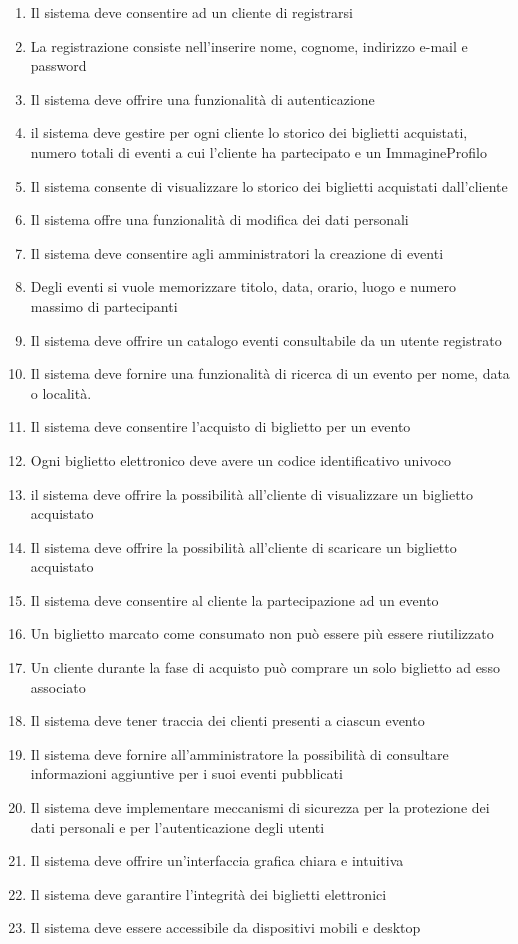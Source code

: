 \begin{enumerate}[]
    \item Il sistema deve consentire ad un cliente di registrarsi
    \item La registrazione consiste nell’inserire nome, cognome, indirizzo e-mail e password
    \item Il sistema deve offrire una funzionalità di autenticazione
    \item il sistema deve gestire per ogni cliente lo storico dei biglietti acquistati, numero totali di eventi a cui l’cliente ha partecipato e un ImmagineProfilo
    \item Il sistema consente di visualizzare lo storico dei biglietti acquistati dall'cliente
    \item Il sistema offre una funzionalità di modifica dei dati personali
    \item Il sistema deve consentire agli amministratori la creazione di eventi
    \item Degli eventi si vuole memorizzare titolo, data, orario, luogo e numero massimo di partecipanti
    \item Il sistema deve offrire un catalogo eventi consultabile da un utente registrato
    \item Il sistema deve fornire una funzionalità di ricerca di un evento per nome, data o località.
    \item Il sistema deve consentire l’acquisto di biglietto per un evento
    \item Ogni biglietto elettronico deve avere un codice identificativo univoco
    \item il sistema deve offrire la possibilità all'cliente di visualizzare un biglietto acquistato
    \item Il sistema deve offrire la possibilità all'cliente di scaricare un biglietto acquistato
    \item Il sistema deve consentire al cliente la partecipazione ad un evento
    \item Un biglietto marcato come consumato non può essere più essere riutilizzato
    \item Un cliente durante la fase di acquisto può comprare un solo biglietto ad esso associato
    \item Il sistema deve tener traccia dei clienti presenti a ciascun evento
    \item Il sistema deve fornire all'amministratore la possibilità di consultare informazioni aggiuntive per i suoi eventi pubblicati
    \item Il sistema deve implementare meccanismi di sicurezza per la protezione dei dati personali e per l’autenticazione degli utenti
    \item Il sistema deve offrire un’interfaccia grafica chiara e intuitiva
    \item Il sistema deve garantire l’integrità dei biglietti elettronici
    \item Il sistema deve essere accessibile da dispositivi mobili e desktop
\end{enumerate}


